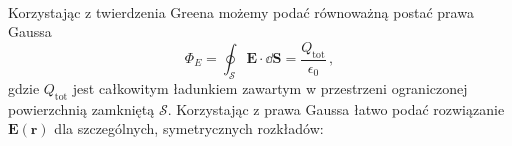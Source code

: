 \documentclass[../main.tex]{subfiles}
\begin{document}
\noindent{}\\

Korzystając z twierdzenia Greena możemy podać równoważną postać prawa Gaussa
\begin{equation*}
    \Phi_E=\oint_\mathcal{S}\mathbf{E}\cdot\dd{\mathbf{S}}=\frac{Q_\text{tot}}{\epsilon_0}\,,
\end{equation*}
gdzie \(Q_\text{tot}\) jest całkowitym ładunkiem zawartym w przestrzeni ograniczonej powierzchnią
zamkniętą \(\mathcal{S}\). Korzystając z prawa Gaussa łatwo podać rozwiązanie
\(\mathbf{E}(\mathbf{r})\) dla szczególnych, symetrycznych rozkładów:
\end{document}
